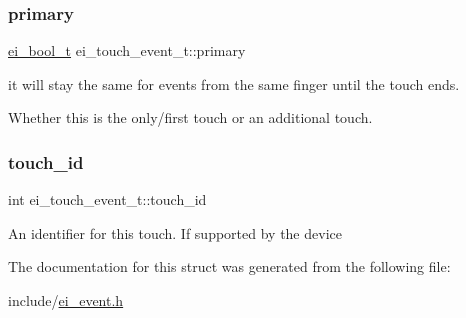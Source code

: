 \subsubsection{\texorpdfstring{primary}{primary}}
{\footnotesize\ttfamily \hyperlink{ei__types_8h_a383b9af13bd6a0a893096ead3c4d8e28}{ei\+\_\+bool\+\_\+t} ei\+\_\+touch\+\_\+event\+\_\+t\+::primary}



it will stay the same for events from the same finger until the touch ends. 

Whether this is the only/first touch or an additional touch. \mbox{\label{structei__touch__event__t_a328a41ee9952d545b22c78047eaf09f6}} 
\subsubsection{\texorpdfstring{touch\+\_\+id}{touch\_id}}
{\footnotesize\ttfamily int ei\+\_\+touch\+\_\+event\+\_\+t\+::touch\+\_\+id}

An identifier for this touch. If supported by the device 

The documentation for this struct was generated from the following file\+:\begin{DoxyCompactItemize}
\item 
include/\hyperlink{ei__event_8h}{ei\+\_\+event.\+h}\end{DoxyCompactItemize}
